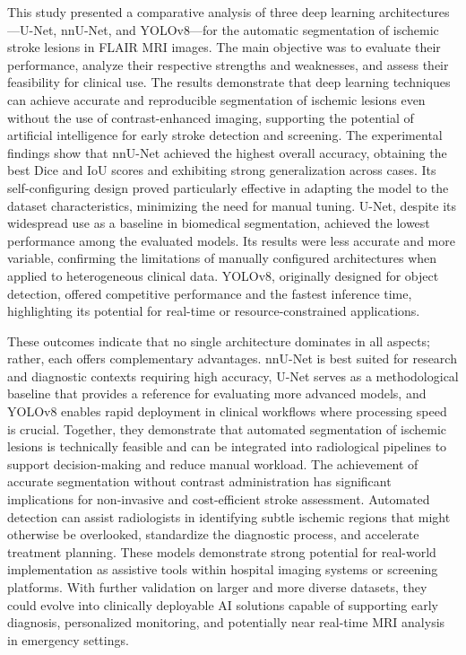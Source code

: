 \documentclass[12pt]{article}
\begin{document}
This study presented a comparative analysis of three deep learning architectures—U-Net, nnU-Net, and YOLOv8—for the automatic segmentation of ischemic stroke lesions in FLAIR MRI images. The main objective was to evaluate their performance, analyze their respective strengths and weaknesses, and assess their feasibility for clinical use. The results demonstrate that deep learning techniques can achieve accurate and reproducible segmentation of ischemic lesions even without the use of contrast-enhanced imaging, supporting the potential of artificial intelligence for early stroke detection and screening.
%
The experimental findings show that nnU-Net achieved the highest overall accuracy, obtaining the best Dice and IoU scores and exhibiting strong generalization across cases. Its self-configuring design proved particularly effective in adapting the model to the dataset characteristics, minimizing the need for manual tuning. U-Net, despite its widespread use as a baseline in biomedical segmentation, achieved the lowest performance among the evaluated models. Its results were less accurate and more variable, confirming the limitations of manually configured architectures when applied to heterogeneous clinical data. YOLOv8, originally designed for object detection, offered competitive performance and the fastest inference time, highlighting its potential for real-time or resource-constrained applications.

These outcomes indicate that no single architecture dominates in all aspects; rather, each offers complementary advantages. nnU-Net is best suited for research and diagnostic contexts requiring high accuracy, U-Net serves as a methodological baseline that provides a reference for evaluating more advanced models, and YOLOv8 enables rapid deployment in clinical workflows where processing speed is crucial. Together, they demonstrate that automated segmentation of ischemic lesions is technically feasible and can be integrated into radiological pipelines to support decision-making and reduce manual workload.
%
The achievement of accurate segmentation without contrast administration has significant implications for non-invasive and cost-efficient stroke assessment. Automated detection can assist radiologists in identifying subtle ischemic regions that might otherwise be overlooked, standardize the diagnostic process, and accelerate treatment planning. These models demonstrate strong potential for real-world implementation as assistive tools within hospital imaging systems or screening platforms. With further validation on larger and more diverse datasets, they could evolve into clinically deployable AI solutions capable of supporting early diagnosis, personalized monitoring, and potentially near real-time MRI analysis in emergency settings.
\end{document}
